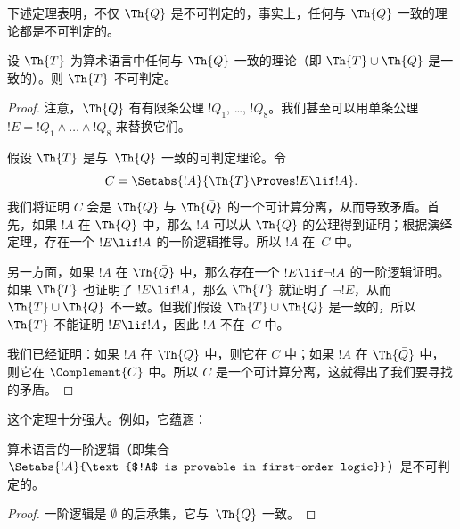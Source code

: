 \documentclass[../../../include/open-logic-section]{subfiles}
\begin{document}


下述定理表明，不仅 $\Th{Q}$ 是不可判定的，事实上，任何与 $\Th{Q}$ 一致的理论都是不可判定的。

\begin{thm}
设 $\Th{T}$ 为算术语言中任何与 $\Th{Q}$ 一致的理论（即 $\Th{T} \cup \Th{Q}$ 是一致的）。则 $\Th{T}$ 不可判定。
\end{thm}

\begin{proof}
注意，$\Th{Q}$ 有有限条公理 $!Q_1$, \dots, $!Q_8$。我们甚至可以用单条公理 $!E = !Q_1 \land
\dots \land !Q_8$ 来替换它们。

假设 $\Th{T}$ 是与~$\Th{Q}$ 一致的可判定理论。令
\[
C = \Setabs{!A}{\Th{T} \Proves !E \lif !A}.
\]
我们将证明 $C$ 会是 $\Th{Q}$ 与 $\Th{\bar Q}$ 的一个可计算分离，从而导致矛盾。首先，如果 $!A$ 在 $\Th{Q}$ 中，那么 $!A$ 可以从 $\Th{Q}$ 的公理得到证明；根据演绎定理，存在一个 $!E \lif !A$ 的一阶逻辑推导。所以 $!A$ 在~$C$ 中。

另一方面，如果 $!A$ 在 $\Th{\bar Q}$ 中，那么存在一个 $!E \lif \lnot !A$ 的一阶逻辑证明。如果 $\Th{T}$ 也证明了 $!E \lif !A$，那么 $\Th{T}$ 就证明了 $\lnot !E$，从而 $\Th{T} \cup \Th{Q}$ 不一致。但我们假设 $\Th{T} \cup \Th{Q}$ 是一致的，所以 $\Th{T}$ 不能证明 $!E \lif !A$，因此 $!A$ 不在~$C$ 中。

我们已经证明：如果 $!A$ 在 $\Th{Q}$ 中，则它在 $C$ 中；如果 $!A$ 在 $\Th{\bar Q}$ 中，则它在 $\Complement{C}$ 中。所以 $C$ 是一个可计算分离，这就得出了我们要寻找的矛盾。
\end{proof}

这个定理十分强大。例如，它蕴涵：

\begin{cor}
  算术语言的一阶逻辑（即集合 $\Setabs{!A}{\text{$!A$ is provable in first-order logic}}$）是不可判定的。
\end{cor}

\begin{proof}
一阶逻辑是 $\emptyset$ 的后承集，它与~$\Th{Q}$ 一致。
\end{proof}
\end{document}
